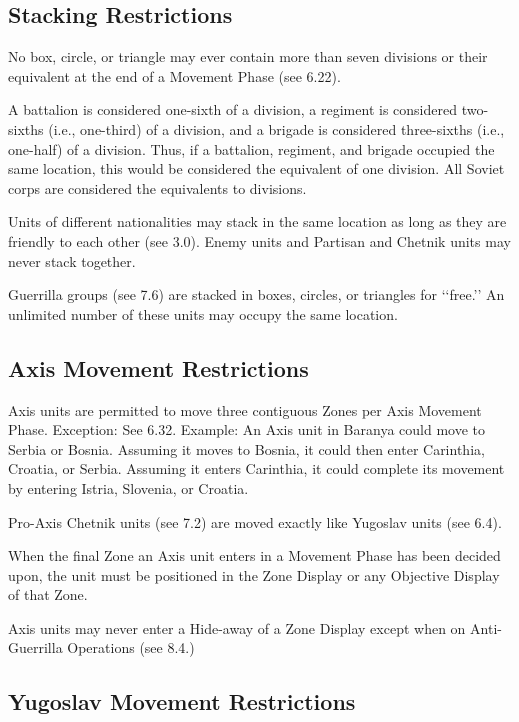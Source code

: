 \subsection{Stacking Restrictions}\label{sec:6.2}

 No box, circle, or triangle may ever contain more than seven divisions or their equivalent at the end of a Movement Phase (see 6.22).

 A battalion is considered one-sixth of a division, a regiment is considered two-sixths (i.e., one-third) of a division, and a brigade is considered three-sixths (i.e., one-half) of a division. Thus, if a battalion, regiment, and brigade occupied the same location, this would be considered the equivalent of one division. All Soviet corps are considered the equivalents to divisions.

 Units of different nationalities may stack in the same location as long as they are friendly to each other (see 3.0). Enemy units and Partisan and Chetnik units may never stack together.

 Guerrilla groups (see 7.6) are stacked in boxes, circles, or triangles for ‘‘free.’’ An unlimited number of these units may occupy the same location.

\subsection{Axis Movement Restrictions}\label{sec:6.3}

 Axis units are permitted to move three contiguous Zones per Axis Movement Phase. Exception: See 6.32. Example: An Axis unit in Baranya could move to Serbia or Bosnia. Assuming it moves to Bosnia, it could then enter Carinthia, Croatia, or Serbia. Assuming it enters Carinthia, it could complete its movement by entering Istria, Slovenia, or Croatia.

 Pro-Axis Chetnik units (see 7.2) are moved exactly like Yugoslav units (see 6.4).

 When the final Zone an Axis unit enters in a Movement Phase has been decided upon, the unit must be positioned in the Zone Display or any Objective Display of that Zone.

 Axis units may never enter a Hide-away of a Zone Display except when on Anti-Guerrilla Operations (see 8.4.)

\subsection{Yugoslav Movement Restrictions}\label{sec:6.4}

